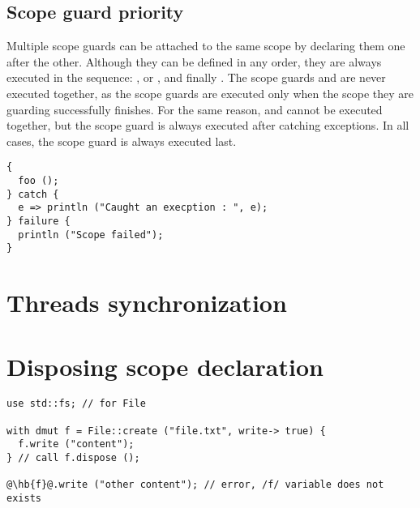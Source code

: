 \subsection{Scope guard priority}

Multiple scope guards can be attached to the same scope by declaring them one
after the other. Although they can be defined in any order, they are always
executed in the sequence: ,  or , and
finally . The scope guards  and  are
never executed together, as the  scope guards are executed only
when the scope they are guarding successfully finishes. For the same reason,
 and  cannot be executed together, but the
 scope guard is always executed after catching exceptions. In all
cases, the  scope guard is always executed last.

\begin{lstlisting}[style=coloredverbatim]
{
  foo ();
} catch {
  e => println ("Caught an execption : ", e);
} failure {
  println ("Scope failed");
}
\end{lstlisting}

\section{Threads synchronization}
\label{sec:thread_sync}

\section{Disposing scope declaration}%
\label{sec:dispose_block}

\begin{lstlisting}[style=coloredverbatim, escapechar=@]
use std::fs; // for File

with dmut f = File::create ("file.txt", write-> true) {
  f.write ("content");
} // call f.dispose ();

@\hb{f}@.write ("other content"); // error, /f/ variable does not exists
\end{lstlisting}
